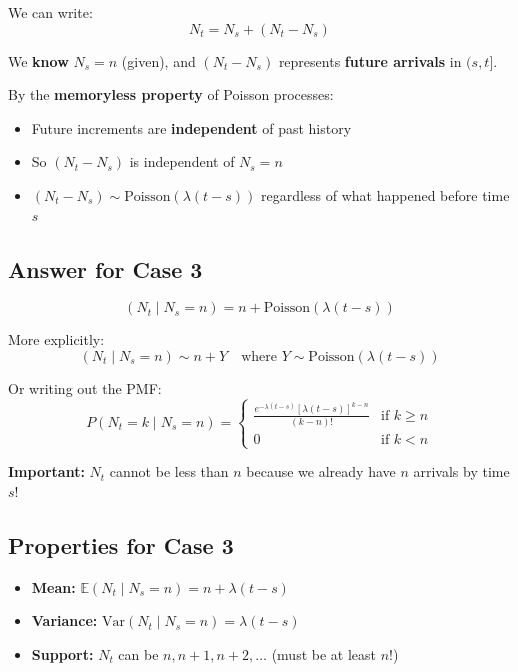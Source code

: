 \documentclass[11pt]{article}
\begin{document}
We can write:
\[
N_t = N_s + (N_t - N_s)
\]

We \textbf{know} $N_s = n$ (given), and $(N_t - N_s)$ represents \textbf{future arrivals} in $(s, t]$.

By the \textbf{memoryless property} of Poisson processes:
\begin{itemize}
    \item Future increments are \textbf{independent} of past history
    \item So $(N_t - N_s)$ is independent of $N_s = n$
    \item $(N_t - N_s) \sim \text{Poisson}(\lambda(t - s))$ regardless of what happened before time $s$
\end{itemize}

\subsection{Answer for Case 3}

\begin{tcolorbox}[colback=purple!10!white,colframe=purple!75!black,title={Case 3: $t > s$}]
\[
\boxed{(N_t \mid N_s = n) = n + \text{Poisson}(\lambda(t - s))}
\]

More explicitly:
\[
(N_t \mid N_s = n) \sim n + Y \quad \text{where } Y \sim \text{Poisson}(\lambda(t-s))
\]

Or writing out the PMF:
\[
P(N_t = k \mid N_s = n) = \begin{cases}
\frac{e^{-\lambda(t-s)}[\lambda(t-s)]^{k-n}}{(k-n)!} & \text{if } k \geq n \\
0 & \text{if } k < n
\end{cases}
\]
\end{tcolorbox}

\textbf{Important:} $N_t$ cannot be less than $n$ because we already have $n$ arrivals by time $s$!

\subsection{Properties for Case 3}

\begin{itemize}
    \item \textbf{Mean:} $\mathbb{E}(N_t \mid N_s = n) = n + \lambda(t - s)$
    \item \textbf{Variance:} $\text{Var}(N_t \mid N_s = n) = \lambda(t - s)$
    \item \textbf{Support:} $N_t$ can be $n, n+1, n+2, \ldots$ (must be at least $n$!)
\end{itemize}
\end{document}
